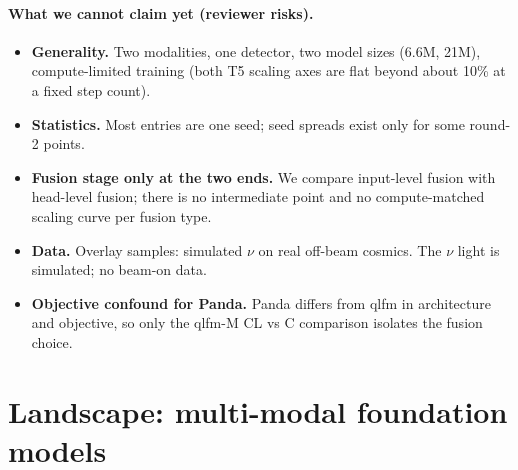 \documentclass[11pt,a4paper]{article}
\begin{document}
\paragraph{What we cannot claim yet (reviewer risks).}
\begin{itemize}
  \item \textbf{Generality.} Two modalities, one detector, two model sizes (6.6M, 21M), compute-limited training (both T5 scaling axes are flat beyond about 10\% at a fixed step count).
  \item \textbf{Statistics.} Most entries are one seed; seed spreads exist only for some round-2 points.
  \item \textbf{Fusion stage only at the two ends.} We compare input-level fusion with head-level fusion; there is no intermediate point and no compute-matched scaling curve per fusion type.
  \item \textbf{Data.} Overlay samples: simulated $\nu$ on real off-beam cosmics. The $\nu$ light is simulated; no beam-on data.
  \item \textbf{Objective confound for Panda.} Panda differs from qlfm in architecture and objective, so only the qlfm-M CL vs C comparison isolates the fusion choice.
\end{itemize}

\section{Landscape: multi-modal foundation models}\label{sec:landscape}
\end{document}
